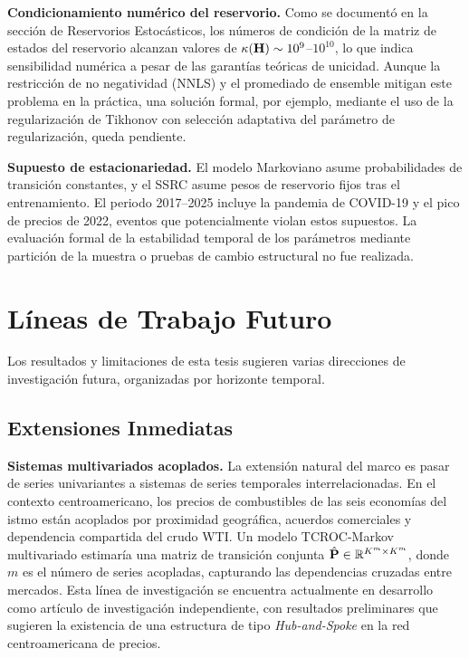 \textbf{Condicionamiento numérico del reservorio.}  Como se
documentó en la sección de Reservorios Estocásticos, los números de
condición de la matriz de estados del reservorio alcanzan valores de
$\kappa(\mathbf{H}) \sim 10^{9}$--$10^{10}$, lo que indica sensibilidad
numérica a pesar de las garantías teóricas de unicidad.  Aunque la
restricción de no negatividad (NNLS) y el promediado de ensemble
mitigan este problema en la práctica, una solución formal,
por ejemplo, mediante el uso de la regularización de Tikhonov con selección
adaptativa del parámetro de regularización, queda pendiente.

\textbf{Supuesto de estacionariedad.}  El modelo Markoviano asume
probabilidades de transición constantes, y el SSRC asume pesos de
reservorio fijos tras el entrenamiento.  El periodo 2017--2025
incluye la pandemia de COVID-19 y el pico de precios de 2022, eventos
que potencialmente violan estos supuestos.  La evaluación formal de
la estabilidad temporal de los parámetros mediante partición de la
muestra o pruebas de cambio estructural no fue realizada.

\section{Líneas de Trabajo Futuro}
\label{sec:trabajo_futuro}

Los resultados y limitaciones de esta tesis sugieren varias
direcciones de investigación futura, organizadas por horizonte
temporal.

\subsection{Extensiones Inmediatas}

\textbf{Sistemas multivariados acoplados.}  La extensión natural del
marco es pasar de series univariantes a sistemas de series temporales
interrelacionadas.  En el contexto centroamericano, los precios de
combustibles de las seis economías del istmo están acoplados por
proximidad geográfica, acuerdos comerciales y dependencia compartida
del crudo WTI.  Un modelo TCROC-Markov multivariado estimaría una
matriz de transición conjunta $\hat{\mathbf{P}} \in
\mathbb{R}^{K^m \times K^m}$, donde $m$ es el número de series
acopladas, capturando las dependencias cruzadas entre mercados.
Esta línea de investigación se encuentra actualmente en desarrollo
como artículo de investigación independiente, con resultados
preliminares que sugieren la existencia de una estructura de tipo
\emph{Hub-and-Spoke} en la red centroamericana de precios.

